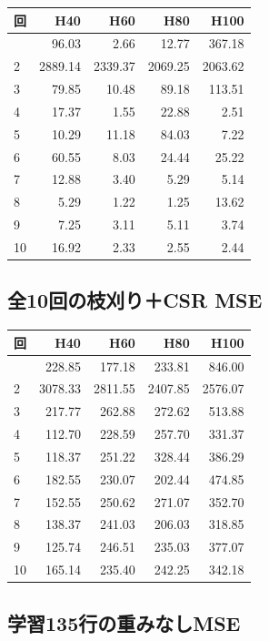 \documentclass[
  10pt,
  a4paper,
]{article}
\begin{document}
\begin{longtable}[]{@{}lrrrr@{}}
\toprule\noalign{}
回 & H40 & H60 & H80 & H100 \\
\midrule\noalign{}
\endhead
\bottomrule\noalign{}
\endlastfoot
1 & 96.03 & 2.66 & 12.77 & 367.18 \\
2 & 2889.14 & 2339.37 & 2069.25 & 2063.62 \\
3 & 79.85 & 10.48 & 89.18 & 113.51 \\
4 & 17.37 & 1.55 & 22.88 & 2.51 \\
5 & 10.29 & 11.18 & 84.03 & 7.22 \\
6 & 60.55 & 8.03 & 24.44 & 25.22 \\
7 & 12.88 & 3.40 & 5.29 & 5.14 \\
8 & 5.29 & 1.22 & 1.25 & 13.62 \\
9 & 7.25 & 3.11 & 5.11 & 3.74 \\
10 & 16.92 & 2.33 & 2.55 & 2.44 \\
\end{longtable}


\subsection{全10回の枝刈り＋CSR
MSE}\label{ux516810ux56deux306eux679dux5208ux308acsr-mse}

\begin{longtable}[]{@{}lrrrr@{}}
\toprule\noalign{}
回 & H40 & H60 & H80 & H100 \\
\midrule\noalign{}
\endhead
\bottomrule\noalign{}
\endlastfoot
1 & 228.85 & 177.18 & 233.81 & 846.00 \\
2 & 3078.33 & 2811.55 & 2407.85 & 2576.07 \\
3 & 217.77 & 262.88 & 272.62 & 513.88 \\
4 & 112.70 & 228.59 & 257.70 & 331.37 \\
5 & 118.37 & 251.22 & 328.44 & 386.29 \\
6 & 182.55 & 230.07 & 202.44 & 474.85 \\
7 & 152.55 & 250.62 & 271.07 & 352.70 \\
8 & 138.37 & 241.03 & 206.03 & 318.85 \\
9 & 125.74 & 246.51 & 235.03 & 377.07 \\
10 & 165.14 & 235.40 & 242.25 & 342.18 \\
\end{longtable}

\subsection{学習135行の重みなしMSE}\label{ux5b66ux7fd2135ux884cux306eux91cdux307fux306aux3057mse}
\end{document}
